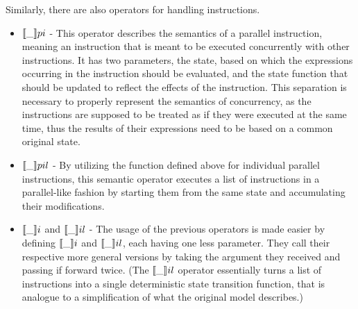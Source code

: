 Similarly, there are also operators for handling instructions.
\begin{itemize}
    \item $\llbracket \_ \rrbracket pi$ - This operator describes the semantics of a parallel instruction, meaning an instruction that is meant to be executed concurrently with other instructions. It has two parameters, the state, based on which the expressions occurring in the instruction should be evaluated, and the state function that should be updated to reflect the effects of the instruction. This separation is necessary to properly represent the semantics of concurrency, as the instructions are supposed to be treated as if they were executed at the same time, thus the results of their expressions need to be based on a common original state.
    \begin{code}
        \>[2]\AgdaSpace{}%
        \AgdaSymbol{:}\AgdaSpace{}%
        \AgdaSpace{}%
        \AgdaSpace{}%
        \AgdaSpace{}%
        \AgdaSpace{}%
        \AgdaSpace{}%
        \AgdaSpace{}%
        \<%
    \end{code}
    
    \item $\llbracket \_ \rrbracket pil$ - By utilizing the function defined above for individual parallel instructions, this semantic operator executes a list of instructions in a parallel-like fashion by starting them from the same state and accumulating their modifications.
    \begin{code}
        \>[2]\AgdaSpace{}%
        \AgdaSymbol{:}\AgdaSpace{}%
        \AgdaSpace{}%
        \AgdaSpace{}%
        \AgdaSpace{}%
        \AgdaSpace{}%
        \AgdaSpace{}%
        \AgdaSpace{}%
        \AgdaSpace{}%
        \<%
    \end{code}
    
    \item $\llbracket \_ \rrbracket i$ and $\llbracket \_ \rrbracket il$ - The usage of the previous operators is made easier by defining $\llbracket \_ \rrbracket i$ and $\llbracket \_ \rrbracket il$, each having one less parameter. They call their respective more general versions by taking the argument they received and passing if forward twice.
    (The $\llbracket \_ \rrbracket il$ operator essentially turns a list of instructions into a single deterministic state transition function, that is analogue to a simplification of what the original model describes.)
    

\end{itemize}
